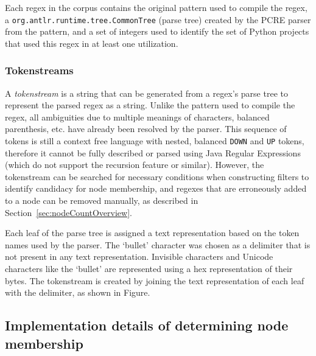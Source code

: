 Each regex in the corpus contains the original pattern used to compile the regex, a {\tt org.antlr.runtime.tree.CommonTree} (parse tree) created by the PCRE parser from the pattern, and a set of integers used to identify the set of Python projects that used this regex in at least one utilization.

\subsubsection{Tokenstreams}
A \emph{tokenstream} is a string that can be generated from a regex's parse tree to represent the parsed regex as a string. Unlike the pattern used to compile the regex, all ambiguities due to multiple meanings of characters, balanced parenthesis, etc. have already been resolved by the parser. This sequence of tokens is still a context free language with nested, balanced \verb!DOWN! and \verb!UP! tokens, therefore it cannot be fully described or parsed using Java Regular Expressions (which do not support the recursion feature or similar).  However, the tokenstream can be searched for necessary conditions when constructing filters to identify candidacy for node membership, and regexes that are erroneously added to a node can be removed manually, as described in Section~\ref{sec:nodeCountOverview}.

Each leaf of the parse tree is assigned a text representation based on the token names used by the parser.  The `bullet' character was chosen as a delimiter that is not present in any text representation.  Invisible characters and Unicode characters like the `bullet' are represented using a hex representation of their bytes.  The tokenstream is created by joining the text representation of each leaf with the delimiter, as shown in Figure.


\subsection{Implementation details of determining node membership}

